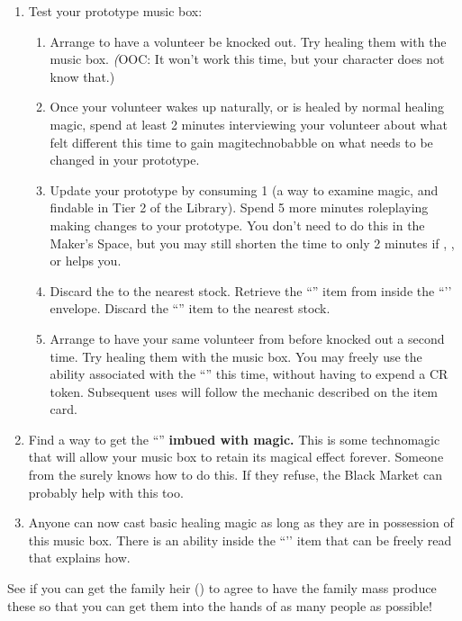 \documentclass[green]{GL2020}
\begin{document}
\begin{enumerate}
  \item Test your prototype music box:
  \begin{enumerate}
\item Arrange to have a volunteer be knocked out. Try healing them with the music box. \emph(OOC: It won’t work this time, but your character does not know that.)
 	\item Once your volunteer wakes up naturally, or is healed by normal healing magic, spend at least 2 minutes interviewing your volunteer about what felt different this time to gain magitechnobabble on what needs to be changed in your prototype.
\item Update your prototype by consuming 1 \iCrystalLens{} (a way to examine magic, and findable in Tier 2 of the Library). Spend 5 more minutes roleplaying making changes to your prototype. You don’t need to do this in the Maker's Space, but you may still shorten the time to only 2 minutes if \cChupInventor{\full}, \cPirate{\full}, \cBunker{\full} or \cTechStar{\full} helps you.
\item Discard the \iCrystalLens{} to the nearest stock. Retrieve the ``\iMagicMusicBox{}'' item from inside the ``\iProtypeMusicBox{}’’ envelope. Discard the ``\iProtypeMusicBox{}'' item to the nearest stock.
\item Arrange to have your same volunteer from before knocked out a second time. Try healing them with the music box. You may freely use the ability associated with the ``\iMagicMusicBox{}'' this time, without having to expend a CR token. Subsequent uses will follow the mechanic described on the item card.
  \end{enumerate}
  \item Find a way to get the ``\iMagicMusicBox{}'' \textbf{imbued with magic.} This is some technomagic that will allow your music box to retain its magical effect forever. Someone from the \pTech{} surely knows how to do this. If they refuse, the Black Market can probably help with this too.
  \item Anyone can now cast basic healing magic as long as they are in possession of this music box. There is an ability inside the ``\iMagicMusicBox{}’’ item that can be freely read that explains how.
\end{enumerate}

See if you can get the \cHeir{\formal} family heir (\cHeir{\full}) to agree to have the family mass produce these so that you can get them into the hands of as many people as possible!
\end{document}
